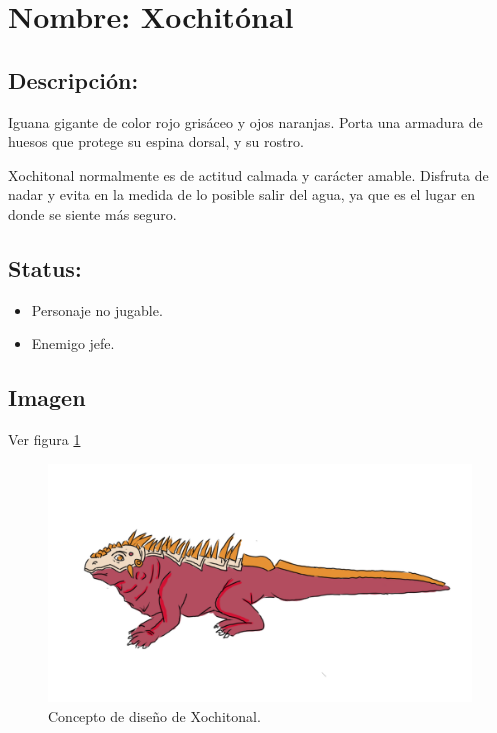 \section{Nombre: Xochitónal}  \label{per:xochitonal}

\subsection{Descripción:}
Iguana gigante de color rojo grisáceo y ojos naranjas. Porta una armadura de huesos que protege su espina dorsal, y su rostro.
\\
\par
Xochitonal normalmente es de actitud calmada y carácter amable. Disfruta de nadar y evita en la medida de lo posible salir del agua, ya que es el lugar en donde se siente más seguro.  
\subsection{Status:}
	\begin{itemize}
		\item Personaje no jugable.
		\item Enemigo jefe.
	\end{itemize}
\subsection{Imagen}
Ver figura \ref{fig:XochitonalDiseno}
\begin{figure}
				\centering
				\includegraphics[height=0.3 \textheight]{Imagenes/Xochitonal}
				\caption{Concepto de diseño de Xochitonal.}
				\label{fig:XochitonalDiseno}
\end{figure}
